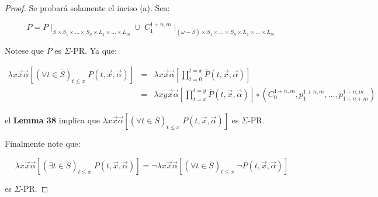   \begin{proof}
    \PN Se probará solamente el inciso (a). Sea:

    \[
      \bar{P} = P \mid_{\bar{S} \times S_{1} \times \dotsc \times S_{n} \times L_{1} \times \dotsc \times L_{m}} \cup \;
      C_{1}^{1+n,m} \mid_{(\omega -\bar{S}) \times S_{1} \times \dotsc \times S_{n} \times L_{1} \times \dotsc \times
      L_{m}}
    \]

    \PN Notese que $\bar{P}$ es $\Sigma$-PR. Ya que:

    \begin{eqnarray}
      \nonumber \lambda x\vec{x}\vec{\alpha}\left[(\forall t \in \bar{S})_{t\leq x} \; P(t,\vec{x},\vec{\alpha})\right]
        &=& \lambda x\vec{x}\vec{\alpha}\left[\prod\limits_{t=0}^{t=x}\bar{P}(t,\vec{x},\vec{\alpha})\right] \\
      \nonumber &=& \lambda xy\vec{x}\vec{\alpha}\left[\prod\limits_{t=x}^{t=y} \bar{P}(t,\vec{x},\vec{\alpha})\right]
        \circ \left(C_{0}^{1+n,m}, p_{1}^{1+n,m}, \dotsc, p_{1+n+m}^{1+n,m}\right)
    \end{eqnarray}

    \PN el \textbf{Lemma 38} implica que $\lambda x\vec{x}\vec{\alpha}\left[(\forall t\in \bar{S})_{t\leq x} \;
    P(t,\vec{x},\vec{\alpha})\right]$ es $\Sigma$-PR.

    \PN Finalmente note que:

    \[
      \lambda x\vec{x}\vec{\alpha}\left[(\exists t \in \bar{S})_{t\leq x} \; P(t,\vec{x},\vec{\alpha})\right] = \lnot
      \lambda x\vec{x}\vec{\alpha}\left[(\forall t \in \bar{S})_{t\leq x} \; \lnot P(t,\vec{x},\vec{\alpha})\right]
    \]

    \PN es $\Sigma$-PR.
  \end{proof}

